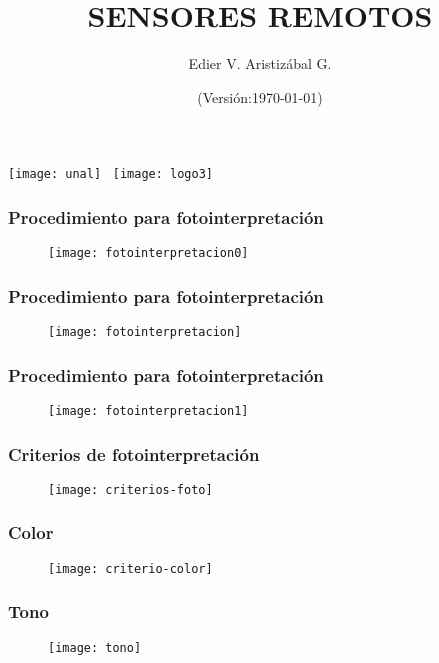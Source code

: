 \documentclass[14pt]{beamer}
\title[Criterios de fotointerpretación]{SENSORES REMOTOS}
\author[Edier Aristizábal]{Edier V. Aristizábal G.}
\institute{\emph{evaristizabalg@unal.edu.co}}
\date{(Versión:\today)}
\begin{document}
\begin{frame}
\titlepage
\centering
	\texttt{[image: unal]}\hspace*{4.75cm}~%
   	\texttt{[image: logo3]} 
\end{frame}
  \begin{frame}
\frametitle{Procedimiento para fotointerpretación}
 \begin{figure}
    \centering
    \texttt{[image: fotointerpretacion0]}
  \end{figure}
\end{frame}
 \begin{frame}
\frametitle{Procedimiento para fotointerpretación}
 \begin{figure}
    \centering
    \texttt{[image: fotointerpretacion]}
  \end{figure}
\end{frame}
 \begin{frame}
\frametitle{Procedimiento para fotointerpretación}
 \begin{figure}
    \centering
    \texttt{[image: fotointerpretacion1]}
  \end{figure}
\end{frame}
 \begin{frame}
\frametitle{Criterios de fotointerpretación}
 \begin{figure}
    \centering
    \texttt{[image: criterios-foto]}
  \end{figure}
\end{frame}
 \begin{frame}
\frametitle{Color}
 \begin{figure}
    \centering
    \texttt{[image: criterio-color]}
  \end{figure}
\end{frame}
 \begin{frame}
\frametitle{Tono}
 \begin{figure}
    \centering
    \texttt{[image: tono]}
  \end{figure}
\end{frame}
\end{document}

